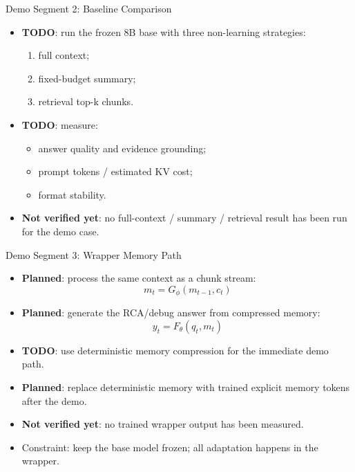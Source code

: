 \begin{frame}{Demo Segment 2: Baseline Comparison}
  \begin{itemize}
    \item \textbf{TODO}: run the frozen 8B base with three non-learning strategies:
      \begin{enumerate}
        \item full context;
        \item fixed-budget summary;
        \item retrieval top-k chunks.
      \end{enumerate}
    \item \textbf{TODO}: measure:
      \begin{itemize}
        \item answer quality and evidence grounding;
        \item prompt tokens / estimated KV cost;
        \item format stability.
      \end{itemize}
    \item \textbf{Not verified yet}: no full-context / summary / retrieval result has been run for the demo case.
  \end{itemize}
\end{frame}

\begin{frame}{Demo Segment 3: Wrapper Memory Path}
  \begin{itemize}
    \item \textbf{Planned}: process the same context as a chunk stream:
      \[
        m_t = G_\phi(m_{t-1}, c_t)
      \]
    \item \textbf{Planned}: generate the RCA/debug answer from compressed memory:
      \[
        y_t = F_\theta(q_t, m_t)
      \]
    \item \textbf{TODO}: use deterministic memory compression for the immediate demo path.
    \item \textbf{Planned}: replace deterministic memory with trained explicit memory tokens after the demo.
    \item \textbf{Not verified yet}: no trained wrapper output has been measured.
    \item Constraint: keep the base model frozen; all adaptation happens in the wrapper.
  \end{itemize}
\end{frame}

